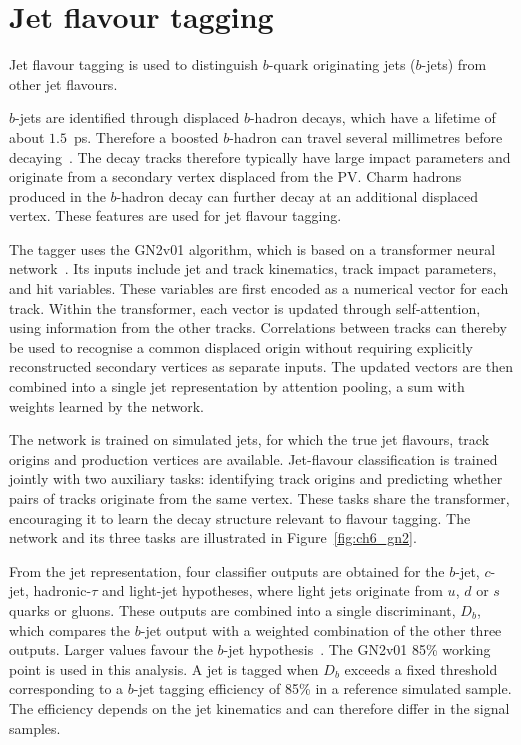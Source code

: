 \section{Jet flavour tagging}
\label{sec:ch6_btag}

Jet flavour tagging is used to distinguish $b$-quark originating jets ($b$-jets) from other jet flavours.

$b$-jets are identified through displaced $b$-hadron decays, which have a lifetime of about $1.5$~ps. Therefore a boosted $b$-hadron can travel several millimetres before decaying~\cite{ATLAS2026GN2}.
The decay tracks therefore typically have large impact parameters and originate from a secondary vertex displaced from the PV.
Charm hadrons produced in the $b$-hadron decay can further decay at an additional displaced vertex.
These features are used for jet flavour tagging.

The tagger uses the GN2v01 algorithm, which is based on a transformer neural network~\cite{ATLAS2026GN2}.
Its inputs include jet and track kinematics, track impact parameters, and hit variables.
These variables are first encoded as a numerical vector for each track.
Within the transformer, each vector is updated through self-attention, using information from the other tracks.
Correlations between tracks can thereby be used to recognise a common displaced origin without requiring explicitly reconstructed secondary vertices as separate inputs.
The updated vectors are then combined into a single jet representation by attention pooling, a sum with weights learned by the network.

The network is trained on simulated jets, for which the true jet flavours, track origins and production vertices are available.
Jet-flavour classification is trained jointly with two auxiliary tasks: identifying track origins and predicting whether pairs of tracks originate from the same vertex.
These tasks share the transformer, encouraging it to learn the decay structure relevant to flavour tagging.
The network and its three tasks are illustrated in Figure~\ref{fig:ch6_gn2}.

From the jet representation, four classifier outputs are obtained for the $b$-jet, $c$-jet, hadronic-$\tau$ and light-jet hypotheses, where light jets originate from $u$, $d$ or $s$ quarks or gluons.
These outputs are combined into a single discriminant, $D_b$, which compares the $b$-jet output with a weighted combination of the other three outputs.
Larger values favour the $b$-jet hypothesis~\cite{ATLAS2026GN2}.
The GN2v01 85\% working point is used in this analysis.
A jet is tagged when $D_b$ exceeds a fixed threshold corresponding to a $b$-jet tagging efficiency of 85\% in a reference simulated sample.
The efficiency depends on the jet kinematics and can therefore differ in the signal samples.

